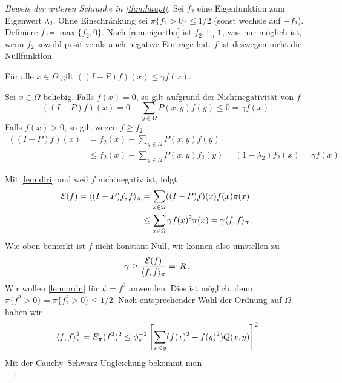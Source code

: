 \documentclass[ngerman,a4paper,11pt]{scrartcl}
\newcommand{\diri}{\mathcal{E}}
\DeclarePairedDelimiter{\sprod}{\langle}{\rangle}	%
\begin{document}
\begin{proof}[Beweis der unteren Schranke in \cref{thm:haupt}]
 Sei $f_2$ eine Eigenfunktion zum Eigenwert $\lambda_2$. Ohne Einschränkung sei
 $\pi\{f_2>0\}\leq 1/2$ (sonst wechsle auf $-f_2$). \\
 Definiere $f\coloneqq\max\{f_2,0\}$.
 Nach \cref{rem:eigortho} ist $f_2\perp_\pi\mathbf{1}$, was nur möglich ist, wenn
 $f_2$ sowohl positive als auch negative Einträge hat. $f$ ist deswegen nicht die Nullfunktion.
 \begin{claim}
  Für alle $x\in\Omega$ gilt $((I-P)f)(x)\leq\gamma f(x)$.
 \end{claim}
 \begin{dproof}
  Sei $x\in\Omega$ beliebig. Falls $f(x)=0$, so gilt aufgrund der Nichtnegativität von $f$
  \begin{equation*}
   ((I-P)f)(x)=0-\sum_{y\in\Omega}P(x,y)f(y)\leq 0=\gamma f(x)\, . 
  \end{equation*}
  Falls $f(x)>0$, so gilt wegen $f\geq f_2$
  \begin{align*}
   ((I-P)f)(x)&=f_2(x)-\sum_{y\in\Omega}P(x,y)f(y) \\
   &\leq f_2(x)-\sum_{y\in\Omega}P(x,y)f_2(y)=(1-\lambda_2)f_2(x)=\gamma f(x)
  \end{align*} 
 \end{dproof}
 Mit \cref{lem:diri} und weil $f$ nichtnegativ ist, folgt
 \begin{align*}
  \begin{split}
   \diri(f)=\sprod{(I-P)f,f}_\pi&=\sum_{x\in\Omega}((I-P)f)(x)f(x)\pi(x) \\
   &\leq \sum_{x\in\Omega}\gamma f(x)^2\pi(x)=\gamma\sprod{f,f}_\pi\, .
  \end{split}
 \end{align*}
 Wie oben bemerkt ist $f$ nicht konstant Null, wir können also umstellen zu
 \begin{equation}
  \label{eq:R}
  \gamma\geq\frac{\diri(f)}{\sprod{f,f}_\pi}\eqqcolon R\, . 
 \end{equation}
 Wir wollen \cref{lem:ordn} für $\psi=f^2$ anwenden. Dies ist möglich, denn
 $\pi\{f^2>0\}=\pi\{f_2^2>0\}\leq 1/2$. Nach entsprechender Wahl der Ordnung auf
 $\Omega$ haben wir
 \begin{equation*}
  \sprod{f,f}_\pi^2=E_\pi(f^2)^2\leq\phi_\star^{-2}\left[ \sum_{x<y}(f(x)^2-f(y)^2)Q(x,y) \right]^2
 \end{equation*}
 Mit der Cauchy--Schwarz-Ungleichung bekommt man
 \begin{equation}

\end{equation}
\end{proof}
\end{document}
